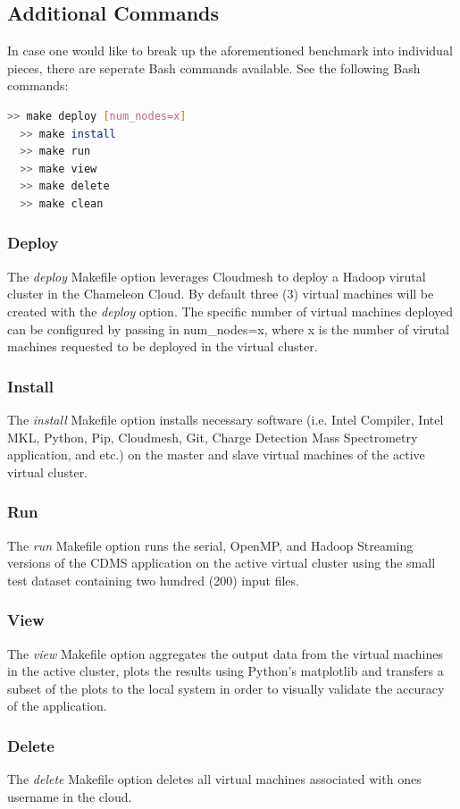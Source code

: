 \documentclass[9pt,twocolumn,twoside]{../../styles/osajnl}
\begin{document}
\subsection{Additional Commands} \label{other}
In case one would like to break up the aforementioned benchmark into
individual pieces, there are seperate Bash commands available.
\noindent See the following Bash commands:
\begin{lstlisting}[language=bash]
  >> make deploy [num_nodes=x]
  >> make install
  >> make run
  >> make view
  >> make delete
  >> make clean
\end{lstlisting}
\subsubsection{Deploy}
The \emph{deploy} Makefile option leverages Cloudmesh to deploy a
Hadoop virutal cluster in the Chameleon Cloud. By default three (3)
virtual machines will be created with the \emph{deploy} option. The
specific number of virtual machines deployed can be configured by
passing in num\_nodes=x, where x is the number of virutal machines
requested to be deployed in the virtual cluster.
\subsubsection{Install}
The \emph{install} Makefile option installs necessary software
(i.e. Intel Compiler, Intel MKL, Python, Pip, Cloudmesh, Git, Charge
Detection Mass Spectrometry application, and etc.) on the master and
slave virtual machines of the active virtual cluster.
\subsubsection{Run}
The \emph{run} Makefile option runs the serial, OpenMP, and Hadoop
Streaming versions of the CDMS application on the active virtual
cluster using the small test dataset containing two hundred (200)
input files.
\subsubsection{View}
The \emph{view} Makefile option aggregates the output data from the
virtual machines in the active cluster, plots the results using
Python's matplotlib and transfers a subset of the plots to the local
system in order to visually validate the accuracy of the application.
\subsubsection{Delete}
The \emph{delete} Makefile option deletes all virtual machines
associated with ones username in the cloud.
\end{document}
